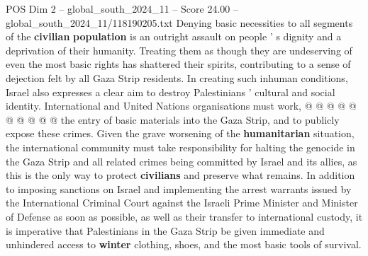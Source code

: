 \begin{textsample}{POS Dim 2 – global\_south\_2024\_11 – Score 24.00 – global\_south\_2024\_11/118190205.txt}
Denying basic necessities to all segments of the \textbf{civilian} \textbf{population} is an outright assault on people ' s dignity and a deprivation of their humanity.
Treating them as though they are undeserving of even the most basic rights has shattered their spirits, contributing to a sense of dejection felt by all Gaza Strip residents.
In creating such inhuman conditions, Israel also expresses a clear aim to destroy Palestinians ' cultural and social identity.
International and United Nations organisations must work, @ @ @ @ @ @ @ @ @ @ the entry of basic materials into the Gaza Strip, and to publicly expose these crimes.
Given the grave worsening of the \textbf{humanitarian} situation, the international community must take responsibility for halting the genocide in the Gaza Strip and all related crimes being committed by Israel and its allies, as this is the only way to protect \textbf{civilians} and preserve what remains.
In addition to imposing sanctions on Israel and implementing the arrest warrants issued by the International Criminal Court against the Israeli Prime Minister and Minister of Defense as soon as possible, as well as their transfer to international custody, it is imperative that Palestinians in the Gaza Strip be given immediate and unhindered access to \textbf{winter} clothing, shoes, and the most basic tools of survival.

\end{textsample}
